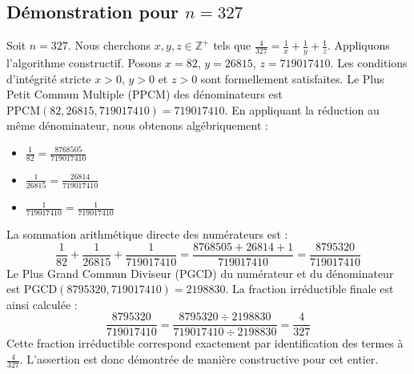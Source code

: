 \documentclass[11pt,a4paper]{article}
\begin{document}
\subsection{Démonstration pour $n = 327$}
Soit $n = 327$. Nous cherchons $x, y, z \in \mathbb{Z}^{+}$ tels que $\frac{4}{327} = \frac{1}{x} + \frac{1}{y} + \frac{1}{z}$.
Appliquons l'algorithme constructif. Posons $x = 82$, $y = 26815$, $z = 719017410$.
Les conditions d'intégrité stricte $x > 0$, $y > 0$ et $z > 0$ sont formellement satisfaites.
Le Plus Petit Commun Multiple (PPCM) des dénominateurs est $\text{PPCM}(82, 26815, 719017410) = 719017410$.
En appliquant la réduction au même dénominateur, nous obtenons algébriquement :
\begin{itemize}
    \item $\frac{1}{82} = \frac{8768505}{719017410}$
    \item $\frac{1}{26815} = \frac{26814}{719017410}$
    \item $\frac{1}{719017410} = \frac{1}{719017410}$
\end{itemize}
La sommation arithmétique directe des numérateurs est :
$$ \frac{1}{82} + \frac{1}{26815} + \frac{1}{719017410} = \frac{8768505 + 26814 + 1}{719017410} = \frac{8795320}{719017410} $$
Le Plus Grand Commun Diviseur (PGCD) du numérateur et du dénominateur est $\text{PGCD}(8795320, 719017410) = 2198830$.
La fraction irréductible finale est ainsi calculée :
$$ \frac{8795320}{719017410} = \frac{8795320 \div 2198830}{719017410 \div 2198830} = \frac{4}{327} $$
Cette fraction irréductible correspond exactement par identification des termes à $\frac{4}{327}$. L'assertion est donc démontrée de manière constructive pour cet entier.
\end{document}
